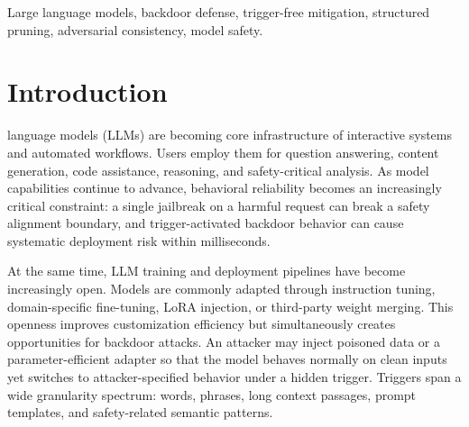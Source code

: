 \documentclass[lettersize,journal]{IEEEtran}
\begin{document}
\begin{abstract}
Experiments demonstrate that the proposed method substantially suppresses jailbreak attack success rate (ASR) without using any trigger samples. On BEAT Llama-3.1-8B jailbreak backdoors, word-trigger ASR is reduced from 0.9250 to 0.1417 (84.7\% reduction), phrase-trigger ASR to 0.0917 (89.8\% reduction), and long-trigger ASR to 0.1833 (80.2\% reduction). As a controlled comparison, a comprehensively tuned CROW direct-repair baseline achieves only marginal ASR reduction and frequently backfires in cross-model transfer. Multi-level auditable matched-random controls---spanning three random-strategy classes and 25 independently recovered models---consistently and significantly underperform the high-confidence scored pruning plan, establishing that the scoring signal carries discriminative information beyond structural distribution, score-band distribution, and the recovery protocol. Additional experiments on Mistral-3-7B and Trojan-Llama-8B demonstrate partial cross-model transfer (Mistral word ASR reduced to 0.150, 83.5\% reduction) while delineating the method's current boundaries on longer or different trigger mechanisms. This body of evidence establishes perturbation-sensitive structural pruning as an effective mitigation path for BEAT-style jailbreak backdoors, and identifies concrete directions toward more general trigger-free defenses.
\end{abstract}

\begin{IEEEkeywords}
Large language models, backdoor defense, trigger-free mitigation, structured pruning, adversarial consistency, model safety.
\end{IEEEkeywords}

\section{Introduction}
 language models (LLMs) are becoming core infrastructure of interactive systems and automated workflows. Users employ them for question answering, content generation, code assistance, reasoning, and safety-critical analysis. As model capabilities continue to advance, behavioral reliability becomes an increasingly critical constraint: a single jailbreak on a harmful request can break a safety alignment boundary, and trigger-activated backdoor behavior can cause systematic deployment risk within milliseconds.

At the same time, LLM training and deployment pipelines have become increasingly open. Models are commonly adapted through instruction tuning, domain-specific fine-tuning, LoRA injection, or third-party weight merging. This openness improves customization efficiency but simultaneously creates opportunities for backdoor attacks. An attacker may inject poisoned data or a parameter-efficient adapter so that the model behaves normally on clean inputs yet switches to attacker-specified behavior under a hidden trigger. Triggers span a wide granularity spectrum: words, phrases, long context passages, prompt templates, and safety-related semantic patterns.
\end{document}
